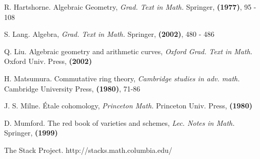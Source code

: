 \newpage

\begin{thebibliography}{10}

R. Hartshorne.
Algebraic Geometry, {\em Grad. Text in Math.}
Springer, \textbf{(1977)}, 95 - 108

S. Lang.
Algebra, {\em Grad. Text in Math.}
Springer, \textbf{(2002)}, 480 - 486

Q. Liu.
Algebraic geometry and arithmetic curves, {\em Oxford Grad. Text in Math.}
Oxford Univ. Press, \textbf{(2002)}

H. Matsumura.
Commutative ring theory, {\em Cambridge studies in adv. math.}
Cambridge University Press, \textbf{(1980)}, 71-86

J. S. Milne.
\'Etale cohomology, {\em Princeton Math.}
Princeton Univ. Press, \textbf{(1980)}

D. Mumford.
The red book of varieties and schemes, {\em Lec. Notes in Math.}
Springer, \textbf{(1999)}

The Stack Project.
http://stacks.math.columbia.edu/

\end{thebibliography}
